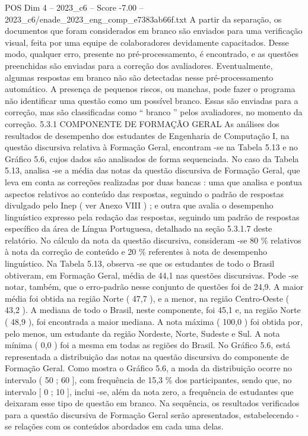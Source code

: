 \begin{textsample}{POS Dim 4 – 2023\_c6 – Score -7.00 – 2023\_c6/enade\_2023\_eng\_comp\_e7383ab66f.txt}
A partir da separação, os documentos que foram considerados em branco são enviados para uma verificação visual, feita por uma equipe de colaboradores devidamente capacitados.
Desse modo, qualquer erro, presente no pré-processamento, é encontrado, e as questões preenchidas são enviadas para a correção dos avaliadores.
Eventualmente, algumas respostas em branco não são detectadas nesse pré-processamento automático.
A presença de pequenos riscos, ou manchas, pode fazer o programa não identificar uma questão como um possível branco.
Essas são enviadas para a correção, mas são classificadas como “ branco ” pelos avaliadores, no momento da correção. 5.3.1 COMPONENTE DE FORMAÇÃO GERAL As análises dos resultados de desempenho dos estudantes de Engenharia de Computação I, na questão discursiva relativa à Formação Geral, encontram -se na Tabela 5.13 e no Gráfico 5.6, cujos dados são analisados de forma sequenciada.
No caso da Tabela 5.13, analisa -se a média das notas da questão discursiva de Formação Geral, que leva em conta as correções realizadas por duas bancas : uma que analisa e pontua aspectos relativos ao conteúdo das respostas, seguindo o padrão de respostas divulgado pelo Inep ( ver Anexo VIII ) ; e outra que avalia o desempenho linguístico expresso pela redação das respostas, seguindo um padrão de respostas específico da área de Língua Portuguesa, detalhado na seção 5.3.1.7 deste relatório.
No cálculo da nota da questão discursiva, consideram -se 80 \% relativos à nota da correção de conteúdo e 20 \% referentes à nota de desempenho linguístico.
Na Tabela 5.13, observa -se que os estudantes de todo o Brasil obtiveram, em Formação Geral, média de 44,1 nas questões discursivas.
Pode -se notar, também, que o erro-padrão nesse conjunto de questões foi de 24,9.
A maior média foi obtida na região Norte ( 47,7 ), e a menor, na região Centro-Oeste ( 43,2 ).
A mediana de todo o Brasil, neste componente, foi 45,1 e, na região Norte ( 48,9 ), foi encontrada a maior mediana.
A nota máxima ( 100,0 ) foi obtida por, pelo menos, um estudante da região Nordeste, Norte, Sudeste e Sul.
A nota mínima ( 0,0 ) foi a mesma em todas as regiões do Brasil.
No Gráfico 5.6, está representada a distribuição das notas na questão discursiva do componente de Formação Geral.
Como mostra o Gráfico 5.6, a moda da distribuição ocorre no intervalo ( 50 ; 60 ], com frequência de 15,3 \% dos participantes, sendo que, no intervalo [ 0 ; 10 ], inclui -se, além da nota zero, a frequência de estudantes que deixaram esse tipo de questão em branco.
Na sequência, os resultados verificados para a questão discursiva de Formação Geral serão apresentados, estabelecendo -se relações com os conteúdos abordados em cada uma delas.

\end{textsample}
